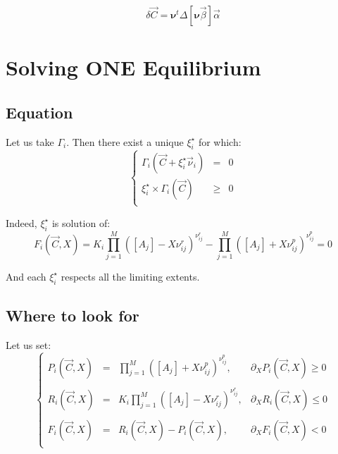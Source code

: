 \documentclass[aps,12pt]{revtex4}
\begin{document}
\begin{equation}
	\delta\vec{C} = \bm{\nu}^t \Delta[\bm{\nu} \vec{\beta}] \vec{\alpha}
\end{equation}


\section{Solving ONE Equilibrium}

\subsection{Equation}
Let us take $\Gamma_i$.
Then there exist a unique $\xi_i^\star$ for which:
\begin{equation}
\left\lbrace
\begin{array}{rcl}
	\Gamma_i(\vec{C} + \xi_i^\star \vec{\nu}_i ) & = & 0\\
	 \xi_i^\star \times \Gamma_i(\vec{C}) &\geq  &0\\
\end{array}
\right.
\end{equation}
 
Indeed, $\xi_i^\star$ is solution of:
\begin{equation}
	 F_i(\vec{C},X) =  K_i \prod_{j=1}^{M} \left([A_j] - X \nu^r_{ij}\right)^{\nu^r_{ij}} 
	- \prod_{j=1}^{M} \left([A_j] + X \nu^p_{ij} \right)^{\nu^p_{ij}} = 0
\end{equation} 

And each $\xi_i^\star$ respects all the limiting extents.

\subsection{Where to look for}
Let us set:
\begin{equation}
\left\lbrace
\begin{array}{rcll}
	P_i(\vec{C},X) & = & \displaystyle \prod_{j=1}^{M} \left([A_j] + X \nu^p_{ij} \right)^{\nu^p_{ij}}, & \partial_X P_i(\vec{C},X) \geq 0 \\
	\\
	R_i(\vec{C},X) & = & \displaystyle K_i \prod_{j=1}^{M} \left([A_j] - X \nu^r_{ij}\right)^{\nu^r_{ij}}, & \partial_X R_i(\vec{C},X) \leq 0 \\
	\\
	 F_i(\vec{C},X) & = & R_i(\vec{C},X)  - P_i(\vec{C},X), & \partial_X F_i(\vec{C},X) < 0\\
\end{array}
\right.
\end{equation}
\end{document}
